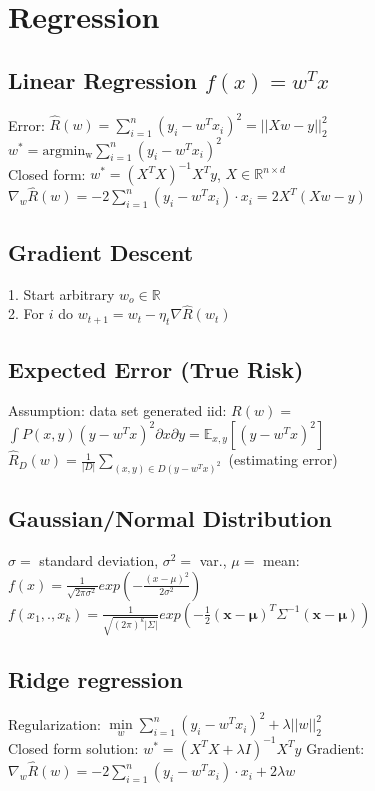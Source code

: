 \section*{Regression}
\subsection*{Linear Regression $f(x)=w^Tx$}
Error: $\hat{R}(w) = \sum_{i=1}^n (y_i - w^Tx_i)^2 = ||Xw-y||^2_2$\\
$w^* = \operatorname{argmin_w} \sum_{i=1}^n (y_i - w^Tx_i)^2$\\
Closed form: $w^*=(X^T X)^{-1} X^T y$, $X\in\mathbb{R}^{n \times d}$\\
$\nabla_w \hat{R}(w) = -2 \sum_{i=1}^n (y_i-w^T x_i) \cdot x_i = 2X^T (Xw-y)$


\subsection*{Gradient Descent}
1. Start arbitrary $w_o \in \mathbb{R}$\\
2. For $i$ do $w_{t+1} = w_t - \eta_t \nabla \hat{R}(w_t)$

\subsection*{Expected Error (True Risk)}
Assumption: data set generated iid: $R(w) =$\\ 
$\int P(x,y) (y-w^Tx)^2 \partial x \partial y = \mathbb{E}_{x,y}[(y-w^Tx)^2]$\\
$\hat{R}_D(w) = \frac{1}{|D|}\sum_{(x,y)\in D (y-w^Tx)^2}$ (estimating error)

\subsection*{Gaussian/Normal Distribution}
$\sigma =$ standard deviation, $\sigma^2 =$ var., $\mu =$ mean:\\
$f(x) = \frac{1}{\sqrt{2\pi\sigma^2}} exp(-\frac{(x-\mu)^2}{2\sigma^2})$\\
$f(x_1,.,x_k)=\frac{1}{\sqrt{(2\pi)^k|\Sigma|}}
exp(-\frac{1}{2}(\boldsymbol{x-\mu})^T\Sigma^{-1}(\boldsymbol{x-\mu}))$

\subsection*{Ridge regression}
Regularization: $\underset{w}{\operatorname{min}} \sum \limits_{i=1}^n (y_i - w^Tx_i)^2 + \lambda ||w||_2^2$\\
Closed form solution: $w^*=(X^T X + \lambda I)^{-1} X^T y$
Gradient: $\nabla_w \hat{R}(w) = -2 \sum \limits_{i=1}^n (y_i-w^T x_i) \cdot x_i + 2 \lambda w$

